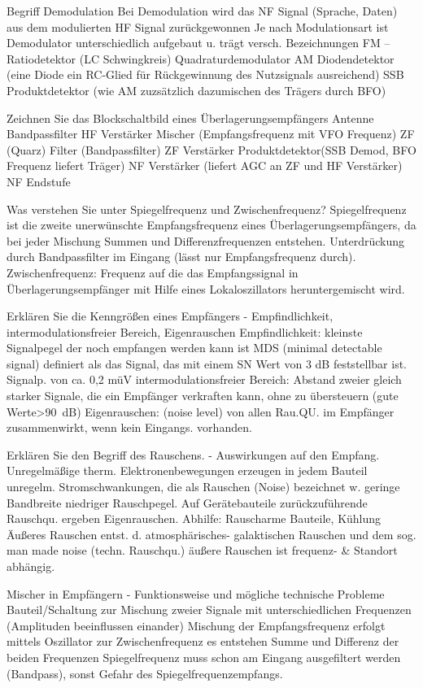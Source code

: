 \documentclass[avery5371,grid,frame,a4paper]{flashcards}
\newcommand{\card}[3]{
  \begin{flashcard}[{\chap} -- #1]{#2}#3\end{flashcard}
}
\begin{document}
\card{36}{Begriff Demodulation}{
  Bei Demodulation wird das NF Signal (Sprache, Daten) aus dem modulierten
HF Signal zurückgewonnen Je nach Modulationsart ist Demodulator 
unterschiedlich aufgebaut u. trägt versch. Bezeichnungen
FM – Ratiodetektor (LC Schwingkreis) Quadraturdemodulator
AM  Diodendetektor (eine Diode ein RC-Glied für Rückgewinnung des
Nutzsignals ausreichend)  
SSB Produktdetektor (wie AM zuzsätzlich dazumischen des Trägers durch BFO) 
}
\card{37}{Zeichnen Sie das Blockschaltbild eines Überlagerungsempfängers}{
  Antenne
Bandpassfilter
HF Verstärker
Mischer (Empfangsfrequenz mit VFO Frequenz)
ZF (Quarz) Filter (Bandpassfilter)
ZF Verstärker
Produktdetektor(SSB Demod, BFO Frequenz liefert Träger)
NF Verstärker (liefert AGC an ZF und HF Verstärker)
NF Endstufe
}
\card{38}{Was verstehen Sie unter Spiegelfrequenz und Zwischenfrequenz?}{
  Spiegelfrequenz ist die zweite unerwünschte Empfangsfrequenz eines
Überlagerungsempfängers, da bei jeder Mischung Summen und 
Differenzfrequenzen entstehen. Unterdrückung durch Bandpassfilter im
Eingang (lässt nur Empfangsfrequenz durch).
Zwischenfrequenz: Frequenz auf die das Empfangssignal in
Überlagerungsempfänger mit Hilfe eines Lokaloszillators 
heruntergemischt wird.
}
\card{39}{Erklären Sie die Kenngrößen eines Empfängers - Empfindlichkeit, intermodulationsfreier Bereich, Eigenrauschen}{
  Empfindlichkeit: kleinste Signalpegel der noch empfangen werden kann
ist MDS (minimal detectable signal) definiert als das Signal, das
mit einem SN Wert von 3 dB feststellbar ist. Signalp. von ca. 0,2 müV 
intermodulationsfreier Bereich: Abstand zweier gleich starker Signale,
die ein Empfänger verkraften kann, ohne zu übersteuern  (gute Werte>\SI{90}{\dB})
Eigenrauschen: (noise level) von allen Rau.QU. im Empfänger zusammenwirkt,
wenn kein Eingangs. vorhanden.
}
\card{40}{Erklären Sie den Begriff des Rauschens. - Auswirkungen auf den Empfang.}{
  Unregelmäßige therm. Elektronenbewegungen erzeugen in jedem Bauteil
unregelm. Stromschwankungen, die als Rauschen (Noise) bezeichnet w.
geringe Bandbreite niedriger Rauschpegel. 
Auf Gerätebauteile zurückzuführende Rauschqu. ergeben Eigenrauschen.
Abhilfe: Rauscharme Bauteile, Kühlung
Äußeres  Rauschen entst. d. atmosphärisches- galaktischen Rauschen
und dem sog. man made noise  (techn. Rauschqu.)
äußere Rauschen ist frequenz- \& Standort abhängig.  
}
\card{41}{Mischer in Empfängern - Funktionsweise und mögliche technische Probleme}{
  Bauteil/Schaltung zur Mischung zweier Signale mit unterschiedlichen 
Frequenzen (Amplituden beeinflussen einander) 
Mischung der Empfangsfrequenz erfolgt mittels Oszillator zur 
Zwischenfrequenz
es entstehen Summe und Differenz der beiden Frequenzen
Spiegelfrequenz muss schon am Eingang ausgefiltert werden
(Bandpass), sonst Gefahr des Spiegelfrequenzempfangs.
}
\end{document}
